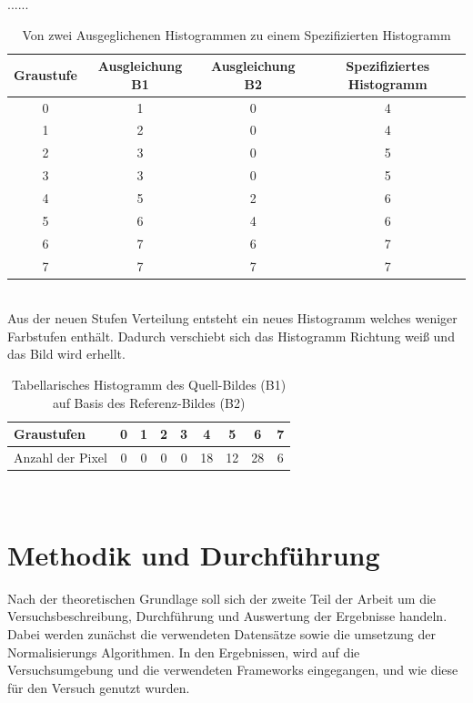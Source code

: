 \documentclass[a4paper,12pt,oneside]{article}
\begin{document}
  ......\\
  \begin{table}
  [h]
  \caption{Von zwei Ausgeglichenen Histogrammen zu einem Spezifizierten Histogramm}
  \centering
  \begin{tabular}{|c|c|c|c|}
  \hline
  Graustufe & Ausgleichung B1 & Ausgleichung B2 & Spezifiziertes Histogramm\\
  \hline
  0 & 1 & 0 & 4\\
  \hline
  1 & 2 & 0 & 4\\
  \hline
  2 & 3 & 0 & 5\\
  \hline
  3 & 3 & 0 & 5\\
  \hline
  4 & 5 & 2 & 6\\
  \hline
  5 & 6 & 4 & 6\\
  \hline
  6 & 7 & 6 & 7\\
  \hline
  7 & 7 & 7 & 7\\
  \hline
  \end{tabular}
  \end{table}\\
  Aus der neuen Stufen Verteilung entsteht ein neues Histogramm welches weniger Farbstufen enthält. Dadurch verschiebt sich das Histogramm Richtung weiß und das Bild wird erhellt.
  \begin{table}
  [h]
  \caption{Tabellarisches Histogramm des Quell-Bildes (B1) auf Basis des Referenz-Bildes (B2)}
  \centering
  \begin{tabular}{|l|c|c|c|c|c|c|c|c|}
  \hline
  Graustufen & 0 & 1 & 2 & 3 & 4 & 5 & 6 & 7\\
  \hline
  Anzahl der Pixel & 0 & 0 & 0 & 0 & 18 & 12 & 28 & 6\\
  \hline
  \end{tabular}
  \end{table}\\

\newpage
  \section{Methodik und Durchführung}\label{s.methudurchf}
Nach der theoretischen Grundlage soll sich der zweite Teil der Arbeit um die Versuchsbeschreibung, Durchführung und Auswertung der Ergebnisse handeln. Dabei werden zunächst die verwendeten Datensätze sowie die umsetzung der Normalisierungs Algorithmen. In den Ergebnissen, wird auf die Versuchsumgebung und die verwendeten Frameworks eingegangen, und wie diese für den Versuch genutzt wurden.
\end{document}
